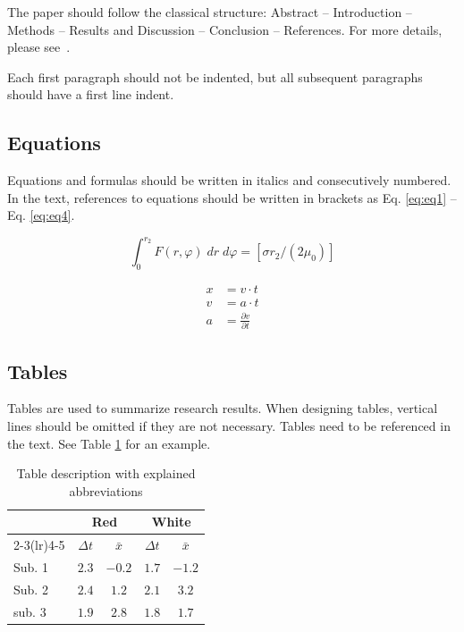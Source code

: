 \documentclass[a4paper]{article}
\begin{document}
The paper should follow the classical structure: Abstract -- Introduction -- Methods -- Results and Discussion -- Conclusion -- References. For more details, please see~\cite{structure2023}.

Each first paragraph should not be indented, but all subsequent paragraphs should have a first line indent.

\subsection{Equations}

Equations and formulas should be written in italics and consecutively numbered. In the text, references to equations should be written in brackets as Eq. \eqref{eq:eq1} -- Eq. \eqref{eq:eq4}.

\begin{equation}
 \int^{r_{2}}_{0}F(r,\varphi)\; dr\; d\varphi= [\sigma r_{2} / (2\mu_{0})]
    \label{eq:eq1}
\end{equation}

\begin{align}
        x &=  v \cdot t     \label{eq:eq2} \\
        v &= a \cdot t      \label{eq:eq3}\\
        a &= \frac{\partial v}{\partial t}      \label{eq:eq4}
\end{align}

\subsection{Tables}

Tables are used to summarize research results. When designing tables, vertical lines should be omitted if they are not necessary. Tables need to be referenced in the text. See Table \ref{tab:table1} for an example.

\begin{table}[htbp]
    \centering
    \caption{Table description with explained abbreviations}
    \label{tab:table1}
    \begin{tabular}{lcccc}
        \toprule
        & \multicolumn{2}{c}{Red} & \multicolumn{2}{c}{White} \\
        \cmidrule(lr){2-3}\cmidrule(lr){4-5}
          & $\Delta t$  & $\bar{x}$    & $\Delta t$  & $\bar{x}$ \\  
        \midrule
        Sub. 1 & $2.3$ & $-0.2$ & $1.7$ & $-1.2$ \\
        Sub. 2 & $2.4$ & $1.2$ & $2.1$ & $3.2$ \\
        sub. 3 & $1.9$ & $2.8$ & $1.8$ & $1.7$  \\
        \bottomrule
    \end{tabular}
\end{table}
\end{document}

